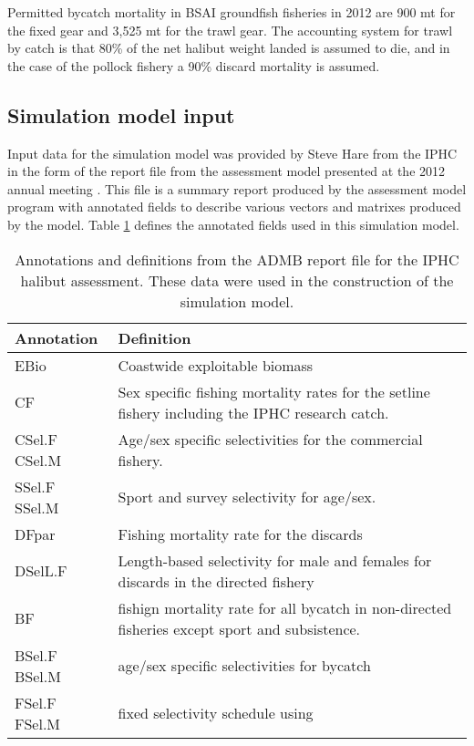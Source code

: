Permitted bycatch mortality in BSAI groundfish fisheries in 2012 are 900 mt for the fixed gear and 3,525 mt for the trawl gear.  The accounting system for trawl by catch is that 80\% of the net halibut weight landed is assumed to die, and in the case of the pollock fishery a 90\% discard mortality is assumed.

\subsection{Simulation model input} %
\label{sub:simulation_model_input}

Input data for the simulation model was provided by Steve Hare from the IPHC in the form of the report file from the assessment model presented at the 2012 annual meeting \citep{Hare2012Rara}.  This file is a summary report produced by the assessment model program with annotated fields to describe various vectors and matrixes produced by the model.  Table \ref{tab:wobblesq.rep} defines the annotated fields used in this simulation model.

\begin{table}
	\caption{Annotations and definitions from the ADMB report file for the IPHC halibut assessment. These data were used in the construction of the simulation model.}
	\label{tab:wobblesq.rep}
	\begin{center}
	\begin{tabular}{p{2cm}p{13.5cm}}
		\hline
		Annotation & Definition \\
		\hline
		EBio & Coastwide exploitable biomass\\ \hline
		
		CF   & Sex specific fishing mortality rates for the setline fishery including the IPHC research catch.\\ \hline
		
		CSel.F  CSel.M & Age/sex specific selectivities for the commercial fishery.  \\ \hline
		
		SSel.F  SSel.M & Sport and survey selectivity for age/sex. \\ \hline
		
		DFpar   & Fishing mortality rate for the discards \\ \hline
		
		DSelL.F & Length-based selectivity for male and females for discards in the directed fishery \\ \hline
		
		BF & fishign mortality rate for all bycatch in non-directed fisheries except sport and subsistence. \\ \hline
		
		BSel.F BSel.M  & age/sex specific selectivities for bycatch\\ \hline
		
		FSel.F FSel.M  & fixed selectivity schedule using 
		\hline
	\end{tabular}
	\end{center}
\end{table}

